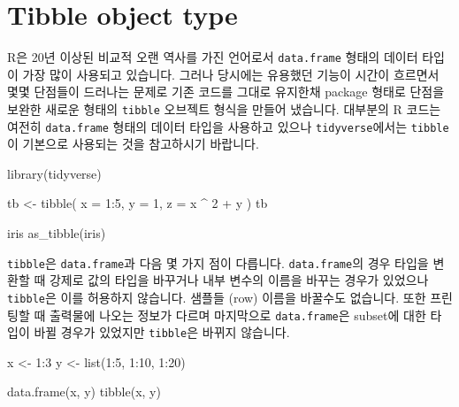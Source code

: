 \documentclass[
  a4paper,
]{book}
\newenvironment{Shaded}{\begin{snugshade}}{\end{snugshade}}
\newcommand{\AttributeTok}[1]{\textcolor[rgb]{0.40,0.45,0.13}{#1}}
\newcommand{\DecValTok}[1]{\textcolor[rgb]{0.68,0.00,0.00}{#1}}
\newcommand{\FunctionTok}[1]{\textcolor[rgb]{0.28,0.35,0.67}{#1}}
\newcommand{\NormalTok}[1]{\textcolor[rgb]{0.00,0.23,0.31}{#1}}
\newcommand{\OtherTok}[1]{\textcolor[rgb]{0.00,0.23,0.31}{#1}}
\newcommand{\SpecialCharTok}[1]{\textcolor[rgb]{0.37,0.37,0.37}{#1}}
\begin{document}
\hypertarget{tibble-object-type}{%
\section{Tibble object type}\label{tibble-object-type}}

R은 20년 이상된 비교적 오랜 역사를 가진 언어로서 \texttt{data.frame}
형태의 데이터 타입이 가장 많이 사용되고 있습니다. 그러나 당시에는
유용했던 기능이 시간이 흐르면서 몇몇 단점들이 드러나는 문제로 기존
코드를 그대로 유지한채 package 형태로 단점을 보완한 새로운 형태의
\texttt{tibble} 오브젝트 형식을 만들어 냈습니다. 대부분의 R 코드는
여전히 \texttt{data.frame} 형태의 데이터 타입을 사용하고 있으나
\texttt{tidyverse}에서는 \texttt{tibble}이 기본으로 사용되는 것을
참고하시기 바랍니다.

\begin{Shaded}
\begin{Highlighting}[]
\FunctionTok{library}\NormalTok{(tidyverse)}

\NormalTok{tb }\OtherTok{\textless{}{-}} \FunctionTok{tibble}\NormalTok{(}
  \AttributeTok{x =} \DecValTok{1}\SpecialCharTok{:}\DecValTok{5}\NormalTok{, }
  \AttributeTok{y =} \DecValTok{1}\NormalTok{, }
  \AttributeTok{z =}\NormalTok{ x }\SpecialCharTok{\^{}} \DecValTok{2} \SpecialCharTok{+}\NormalTok{ y}
\NormalTok{)}
\NormalTok{tb}

\NormalTok{iris}
\FunctionTok{as\_tibble}\NormalTok{(iris)}
\end{Highlighting}
\end{Shaded}

\texttt{tibble}은 \texttt{data.frame}과 다음 몇 가지 점이 다릅니다.
\texttt{data.frame}의 경우 타입을 변환할 때 강제로 값의 타입을 바꾸거나
내부 변수의 이름을 바꾸는 경우가 있었으나 \texttt{tibble}은 이를
허용하지 않습니다. 샘플들 (row) 이름을 바꿀수도 없습니다. 또한 프린팅할
때 출력물에 나오는 정보가 다르며 마지막으로 \texttt{data.frame}은
subset에 대한 타입이 바뀔 경우가 있었지만 \texttt{tibble}은 바뀌지
않습니다.

\begin{Shaded}
\begin{Highlighting}[]
\NormalTok{x }\OtherTok{\textless{}{-}} \DecValTok{1}\SpecialCharTok{:}\DecValTok{3}
\NormalTok{y }\OtherTok{\textless{}{-}} \FunctionTok{list}\NormalTok{(}\DecValTok{1}\SpecialCharTok{:}\DecValTok{5}\NormalTok{, }\DecValTok{1}\SpecialCharTok{:}\DecValTok{10}\NormalTok{, }\DecValTok{1}\SpecialCharTok{:}\DecValTok{20}\NormalTok{)}

\FunctionTok{data.frame}\NormalTok{(x, y)}
\FunctionTok{tibble}\NormalTok{(x, y)}
\end{Highlighting}
\end{Shaded}
\end{document}
